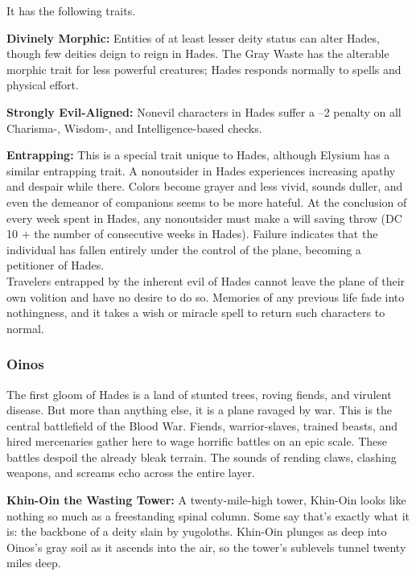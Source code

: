 It has the following traits.
\begin{itemize*}
\item \textbf{Divinely Morphic:} Entities of at least lesser deity status
can alter Hades, though few deities deign to reign in Hades. The Gray Waste has the alterable morphic trait for less powerful creatures; Hades responds normally to spells and physical effort.
\item \textbf{Strongly Evil-Aligned:} Nonevil characters in Hades suffer a –2 penalty on all Charisma-, Wisdom-, and Intelligence-based checks.
\item \textbf{Entrapping:} This is a special trait unique to Hades, although Elysium has a similar entrapping trait. A nonoutsider in Hades experiences increasing apathy and despair while there. Colors become grayer and less vivid, sounds duller, and even the demeanor of companions seems to be more hateful. At the conclusion of every week spent in Hades, any nonoutsider must make a will saving throw (DC 10 + the number of consecutive weeks in Hades). Failure indicates that the individual has fallen entirely under the control of the plane, becoming a petitioner of Hades. \\

Travelers entrapped by the inherent evil of Hades cannot leave the plane of their own volition and have no desire to do so. Memories of any previous life fade into nothingness, and it takes a wish or miracle spell to return such characters to normal.
\end{itemize*}

\subsubsection{Oinos}
The first gloom of Hades is a land of stunted trees, roving fiends, and virulent disease. But more than anything else, it is a plane ravaged by war. This is the central battlefield of the Blood War. Fiends, warrior-slaves, trained beasts, and hired mercenaries gather here to wage horrific battles on an epic scale. These battles despoil the already bleak terrain. The sounds of rending claws, clashing weapons, and screams echo across the entire layer.

\textbf{Khin-Oin the Wasting Tower:} A twenty-mile-high tower, Khin-Oin looks like nothing so much as a freestanding spinal column. Some say that's exactly what it is: the backbone of a deity slain by yugoloths. Khin-Oin plunges as deep into Oinos's gray soil as it ascends into the air, so the tower's sublevels tunnel twenty miles deep.

